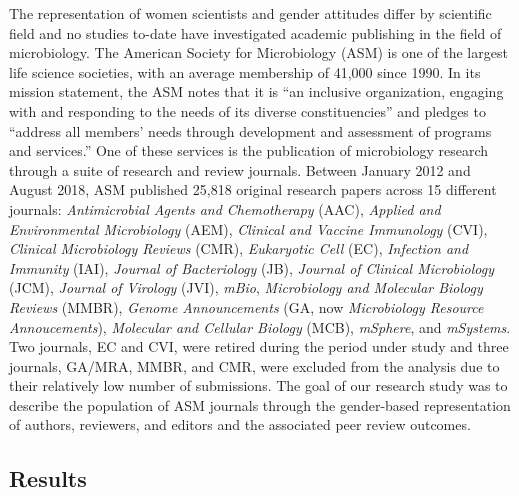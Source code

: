 \documentclass[11pt,]{article}
\begin{document}
The representation of women scientists and gender attitudes differ by
scientific field and no studies to-date have investigated academic
publishing in the field of microbiology. The American Society for
Microbiology (ASM) is one of the largest life science societies, with an
average membership of 41,000 since 1990. In its mission statement, the
ASM notes that it is ``an inclusive organization, engaging with and
responding to the needs of its diverse constituencies'' and pledges to
``address all members' needs through development and assessment of
programs and services.'' One of these services is the publication of
microbiology research through a suite of research and review journals.
Between January 2012 and August 2018, ASM published 25,818 original
research papers across 15 different journals: \emph{Antimicrobial Agents
and Chemotherapy} (AAC), \emph{Applied and Environmental Microbiology}
(AEM), \emph{Clinical and Vaccine Immunology} (CVI), \emph{Clinical
Microbiology Reviews} (CMR), \emph{Eukaryotic Cell} (EC),
\emph{Infection and Immunity} (IAI), \emph{Journal of Bacteriology}
(JB), \emph{Journal of Clinical Microbiology} (JCM), \emph{Journal of
Virology} (JVI), \emph{mBio}, \emph{Microbiology and Molecular Biology
Reviews} (MMBR), \emph{Genome Announcements} (GA, now \emph{Microbiology
Resource Annoucements}), \emph{Molecular and Cellular Biology} (MCB),
\emph{mSphere}, and \emph{mSystems}. Two journals, EC and CVI, were
retired during the period under study and three journals, GA/MRA, MMBR,
and CMR, were excluded from the analysis due to their relatively low
number of submissions. The goal of our research study was to describe
the population of ASM journals through the gender-based representation
of authors, reviewers, and editors and the associated peer review
outcomes.

\subsection{Results}\label{results}
\end{document}

